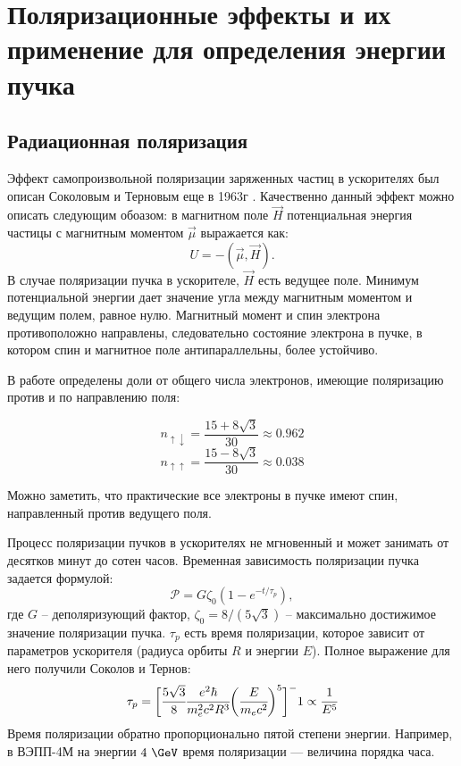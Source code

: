 \chapter{Поляризационные эффекты и их применение для определения энергии пучка}
\label{sec:respnant_dep}
\section{Радиационная поляризация}
Эффект самопроизвольной поляризации заряженных частиц в ускорителях был описан Соколовым и Терновым еще в 1963г \cite{SokolovTernov63}. Качественно данный эффект можно описать следующим обоазом: в магнитном поле $\vec{H}$ потенциальная энергия частицы с магнитным моментом  $\vec{\mu}$ выражается как: 
\begin{equation}
U = - (\vec{\mu}, \vec{H}).
\end{equation} 
В случае поляризации пучка в ускорителе, $\vec{H}$ есть ведущее поле. Минимум потенциальной энергии дает значение угла между магнитным моментом и ведущим полем, равное нулю. Магнитный момент и спин электрона противоположно направлены, следовательно состояние электрона в пучке, в котором спин и магнитное поле антипараллельны, более устойчиво.
\par В работе  \cite{sokolov} определены доли от общего числа электронов, имеющие поляризацию против и по направлению поля: 
\begin{multicols}{2}
	\noindent
	\begin{equation}
	n_{\uparrow\downarrow} = \frac{15+8\sqrt{3}}{30} \approx 0.962 
	\end{equation}
	\begin{equation}
	n_{\uparrow\uparrow} = \frac{15-8\sqrt{3}}{30} \approx 0.038
	\end{equation}
\end{multicols}%
\noindent Можно заметить, что практические все электроны в пучке имеют спин, направленный против ведущего поля.
\par Процесс поляризации пучков в ускорителях не мгновенный и может занимать от десятков минут до сотен часов. Временная зависимость поляризации пучка задается формулой: 
\begin{equation}
	\mathcal{P} = G\zeta_0(1-e^{-t/\tau_p}),
	\label{eq:polDepOnTime}
\end{equation}
где $G$ -- деполяризующий фактор, $\zeta_0 = 8/(5\sqrt{3})$ -- максимально достижимое значение поляризации пучка. $\tau_p$ есть время поляризации, которое зависит от параметров ускорителя (радиуса орбиты $R$ и энергии $E$). Полное выражение для него получили Соколов и Тернов:
\begin{equation}
\tau_p = \biggl[\cfrac{5 \sqrt{3}}{8} \cfrac{e^2\hbar}{m_e ^2c^2 R^3} \biggl(\cfrac{E}{m_ec^2}\biggr)^5 \biggr]^-1 \propto \cfrac{1}{E^5}
\label{eq:pol_time}
\end{equation} 
Время поляризации обратно пропорционально пятой степени энергии. Например, в ВЭПП-4М на энергии $4~\GeV$ время поляризации --- величина порядка часа. 

